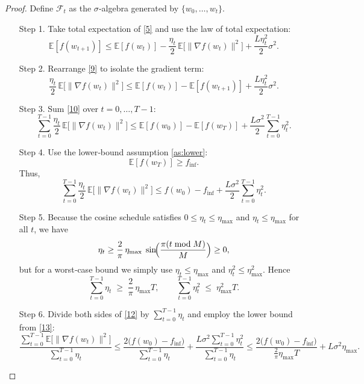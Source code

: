 \documentclass{article}
\begin{document}
\begin{proof}
Define $\mathcal{F}_t$ as the $\sigma$‑algebra generated by $\{w_0,\dots,w_t\}$.  
\begin{enumerate}
\item[Step 1.] Take total expectation of \eqref{5} and use the law of total expectation:
\[
\mathbb{E}[f(w_{t+1})]
\le \mathbb{E}[f(w_t)]-\frac{\eta_t}{2}\,\mathbb{E}\!\big[\|\nabla f(w_t)\|^2\big]
+\frac{L\eta_t^2}{2}\sigma^2 .
\tag{9}
\]

\item[Step 2.] Rearrange \eqref{9} to isolate the gradient term:
\[
\frac{\eta_t}{2}\,\mathbb{E}\!\big[\|\nabla f(w_t)\|^2\big]
\le \mathbb{E}[f(w_t)]-\mathbb{E}[f(w_{t+1})]
+\frac{L\eta_t^2}{2}\sigma^2 .
\tag{10}
\]

\item[Step 3.] Sum \eqref{10} over $t=0,\dots,T-1$:
\[
\sum_{t=0}^{T-1}\frac{\eta_t}{2}\,
\mathbb{E}\!\big[\|\nabla f(w_t)\|^2\big]
\le \mathbb{E}[f(w_0)]-\mathbb{E}[f(w_T)]
+\frac{L\sigma^2}{2}\sum_{t=0}^{T-1}\eta_t^2 .
\tag{11}
\]

\item[Step 4.] Use the lower‑bound assumption \ref{as:lower}:
\[
\mathbb{E}[f(w_T)]\ge f_{\inf}.
\]
Thus,
\[
\sum_{t=0}^{T-1}\frac{\eta_t}{2}\,
\mathbb{E}\!\big[\|\nabla f(w_t)\|^2\big]
\le f(w_0)-f_{\inf}
+\frac{L\sigma^2}{2}\sum_{t=0}^{T-1}\eta_t^2 .
\tag{12}
\]

\item[Step 5.] Because the cosine schedule satisfies $0\le\eta_t\le\eta_{\max}$ and $\eta_t\le\eta_{\max}$ for all $t$, we have
\[
\eta_t \ge \frac{2}{\pi}\,\eta_{\max}\;\sin\!\Bigl(\frac{\pi(t\bmod M)}{M}\Bigr) \ge 0,
\]
but for a worst‑case bound we simply use $\eta_t\le\eta_{\max}$ and $\eta_t^2\le\eta_{\max}^2$. Hence
\[
\sum_{t=0}^{T-1}\eta_t \;\ge\; \frac{2}{\pi}\, \eta_{\max} T ,\qquad
\sum_{t=0}^{T-1}\eta_t^2\;\le\; \eta_{\max}^2 T .
\tag{13}
\]

\item[Step 6.] Divide both sides of \eqref{12} by $\sum_{t=0}^{T-1}\eta_t$ and employ the lower bound from \eqref{13}:
\[
\frac{\displaystyle\sum_{t=0}^{T-1}\mathbb{E}\!\big[\|\nabla f(w_t)\|^2\big]}
{\displaystyle\sum_{t=0}^{T-1}\eta_t}
\le
\frac{2\big(f(w_0)-f_{\inf}\big)}{\displaystyle\sum_{t=0}^{T-1}\eta_t}
+\frac{L\sigma^2\displaystyle\sum_{t=0}^{T-1}\eta_t^2}
{\displaystyle\sum_{t=0}^{T-1}\eta_t}
\le
\frac{2\big(f(w_0)-f_{\inf}\big)}{\frac{2}{\pi}\eta_{\max} T}
+L\sigma^2\eta_{\max}.
\tag{14}
\]


\end{enumerate}
\end{proof}
\end{document}
